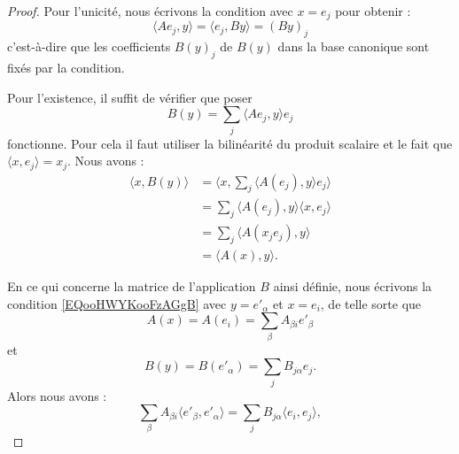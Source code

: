 \begin{proof}
    Pour l'unicité, nous écrivons la condition avec \( x=e_j\) pour obtenir :
    \begin{equation}
        \langle Ae_j, y\rangle = \langle e_j, By\rangle =(By)_j
    \end{equation}
    c'est-à-dire que les coefficients \( B(y)_j\) de \( B(y)\) dans la base canonique sont fixés par la condition.

    Pour l'existence, il suffit de vérifier que poser
    \begin{equation}
        B(y)=\sum_j\langle Ae_j, y\rangle e_j
    \end{equation}
    fonctionne. Pour cela il faut utiliser la bilinéarité du produit scalaire et le fait que \( \langle x, e_j\rangle =x_j\). Nous avons :
    \begin{subequations}
        \begin{align}
            \langle x, B(y)\rangle &=\langle x, \sum_j\langle A(e_j), y\rangle e_j\rangle \\
            &=\sum_j\langle A(e_j), y\rangle \langle x, e_j\rangle \\
            &=\sum_j\langle A(x_je_j), y\rangle \\
            &=\langle A(x), y\rangle .
        \end{align}
    \end{subequations}

En ce qui concerne la matrice de l'application \( B\) ainsi définie, nous écrivons la condition \eqref{EQooHWYKooFzAGgB} avec \( y=e'_{\alpha}\) et \( x=e_i\), de telle sorte que
\begin{equation}
    A(x)=A(e_i)=\sum_{\beta}A_{\beta i}e'_{\beta}
\end{equation}
et
\begin{equation}
    B(y)=B(e'_{\alpha})=\sum_jB_{j\alpha}e_j.
\end{equation}
Alors nous avons :
\begin{equation}
    \sum_{\beta}A_{\beta i}\langle e'_{\beta}, e'_{\alpha}\rangle =\sum_j B_{j\alpha}\langle e_i, e_j\rangle ,
\end{equation}



\end{proof}
